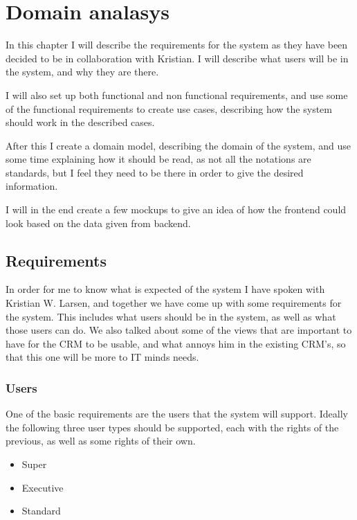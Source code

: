 \chapter{Domain analasys}
\label{chap:Domain analasys}
In this chapter I will describe the requirements for the system as they have been decided to be in collaboration with Kristian. I will describe what users will be in the system, and why they are there.

I will also set up both functional and non functional requirements, and use some of the functional requirements to create use cases, describing how the system should work in the described cases.

After this I create a domain model, describing the domain of the system, and use some time explaining how it should be read, as not all the notations are standards, but I feel they need to be there in order to give the desired information.

I will in the end create a few mockups to give an idea of how the frontend could look based on the data given from backend.

\section{Requirements}
\label{sec:Requirements}
In order for me to know what is expected of the system I have spoken with Kristian W. Larsen, and together we have come up with some requirements for the system. This includes what users should be in the system, as well as what those users can do. We also talked about some of the views that are important to have for the CRM to be usable, and what annoys him in the existing CRM's, so that this one will be more to IT minds needs.

\subsection{Users}
\label{sub:Users}

One of the basic requirements are the users that the system will support. Ideally the following three user types should be supported, each with the rights of the previous, as well as some rights of their own.

\begin{itemize}
  \item Super
  \item Executive
  \item Standard
\end{itemize}

